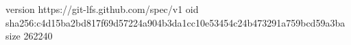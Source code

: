 version https://git-lfs.github.com/spec/v1
oid sha256:c4d15ba2bd817f69d57224a904b3da1cc10e53454c24b473291a759bcd59a3ba
size 262240
